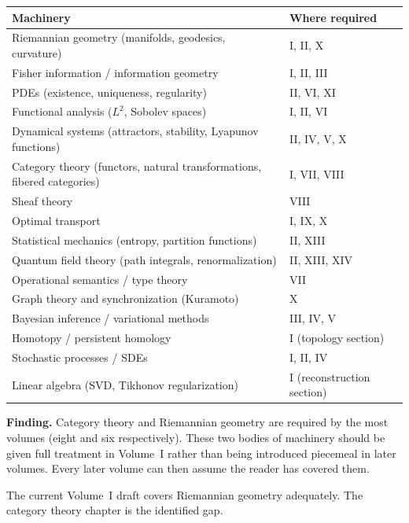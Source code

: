 \documentclass[11pt, a4paper]{article}
\begin{document}
\medskip
\begin{longtable}{p{5cm}p{8cm}}
\toprule
\textbf{Machinery} & \textbf{Where required} \\
\midrule
Riemannian geometry (manifolds, geodesics, curvature) &
  I, II, X \\
Fisher information / information geometry &
  I, II, III \\
PDEs (existence, uniqueness, regularity) &
  II, VI, XI \\
Functional analysis ($L^2$, Sobolev spaces) &
  I, II, VI \\
Dynamical systems (attractors, stability, Lyapunov functions) &
  II, IV, V, X \\
Category theory (functors, natural transformations, fibered categories) &
  I, VII, VIII \\
Sheaf theory &
  VIII \\
Optimal transport &
  I, IX, X \\
Statistical mechanics (entropy, partition functions) &
  II, XIII \\
Quantum field theory (path integrals, renormalization) &
  II, XIII, XIV \\
Operational semantics / type theory &
  VII \\
Graph theory and synchronization (Kuramoto) &
  X \\
Bayesian inference / variational methods &
  III, IV, V \\
Homotopy / persistent homology &
  I (topology section) \\
Stochastic processes / SDEs &
  I, II, IV \\
Linear algebra (SVD, Tikhonov regularization) &
  I (reconstruction section) \\
\bottomrule
\end{longtable}

\medskip
\begin{notebox}
\textbf{Finding.} Category theory and Riemannian geometry are required
by the most volumes (eight and six respectively). These two bodies of
machinery should be given full treatment in Volume~I rather than being
introduced piecemeal in later volumes. Every later volume can then
assume the reader has covered them.

The current Volume~I draft covers Riemannian geometry adequately.
The category theory chapter is the identified gap.
\end{notebox}

\end{document}
